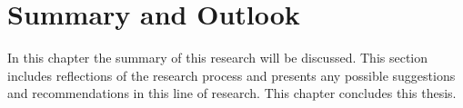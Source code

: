 \section{Summary and Outlook} \label{outlook}

In this chapter the summary of this research will be discussed. 
This section includes reflections of the research process and presents any possible suggestions and recommendations in this line of research. 
This chapter concludes this thesis.
